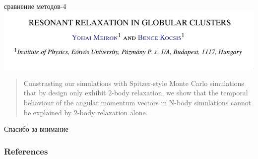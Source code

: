 \documentclass{beamer}
\begin{document}
    \begin{frame}{сравнение методов-4}
      \includegraphics[width=0.9\linewidth]{img/mcwrong1}
      \vfill
      \begin{quote}
        Constrasting our simulations with Spitzer-style Monte
        Carlo simulations that by design only exhibit 2-body
        relaxation, we show that the temporal behaviour of 
        the angular momentum vectors in N-body simulations cannot
        be explained by 2-body relaxation alone.
      \end{quote}
    \end{frame}
    
    \begin{frame}[focus]
        Спасибо за внимание
        \nocite{*}
    \end{frame}
    
    \begin{frame}[t,allowframebreaks]
      \frametitle{References}
      \printbibliography
    \end{frame}
\end{document}
